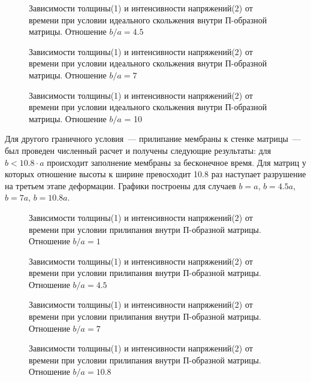 		\begin{figure}[h!]	
				\def\svgwidth{\columnwidth}
				\caption{Зависимости толщины(1) и интенсивности напряжений(2) от времени при условии идеального скольжения внутри П-образной матрицы. Отношение $b/a = 4.5$} 
				\label{vert_sliging_4ba}
		\end{figure}
				\begin{figure}[h!]	
				\def\svgwidth{\columnwidth}
				\caption{Зависимости толщины(1) и интенсивности напряжений(2) от времени при условии идеального скольжения внутри П-образной матрицы. Отношение $b/a = 7$} 
				\label{vert_sliging_7ba}
		\end{figure}
				\begin{figure}[h!]	
				\def\svgwidth{\columnwidth}
				\caption{Зависимости толщины(1) и интенсивности напряжений(2) от времени при условии идеального скольжения внутри П-образной матрицы. Отношение $b/a$ = 10} 
				\label{vert_sliging_10ba}
		\end{figure}

Для другого граничного условия~--- прилипание мембраны к стенке матрицы~--- был проведен численный расчет и получены следующие результаты:
для \linebreak$b<10.8\cdot a$ происходит заполнение мембраны за бесконечное время. Для матриц у которых отношение высоты к ширине превосходит
10.8 раз наступает разрушение на третьем этапе деформации. Графики построены для случаев $b=a$, $b=4.5a$, $b=7a$, $b=10.8a$.
 
						 
		\begin{figure}[h!]	
				\def\svgwidth{\columnwidth}
				\caption{Зависимости толщины(1) и интенсивности напряжений(2) от времени при условии прилипания внутри П-образной матрицы. Отношение $b/a = 1$} 
				\label{vert_stick_ba}
		\end{figure}

		\begin{figure}[h!]	
				\def\svgwidth{\columnwidth}
				\caption{Зависимости толщины(1) и интенсивности напряжений(2) от времени при условии прилипания внутри П-образной матрицы. Отношение $b/a = 4.5$} 
				\label{vert_stick_4ba}
		\end{figure}
				\begin{figure}[h!]	
				\def\svgwidth{\columnwidth}
				\caption{Зависимости толщины(1) и интенсивности напряжений(2) от времени при условии прилипания внутри П-образной матрицы. Отношение $b/a = 7$ }
				\label{vert_stick_7ba}
		\end{figure}
				\begin{figure}[h!]	
				\def\svgwidth{\columnwidth}
				\caption{Зависимости толщины(1) и интенсивности напряжений(2) от времени при условии прилипания внутри П-образной матрицы. Отношение $b/a = 10.8$} 
				\label{vert_stick_10ba}
		\end{figure}

